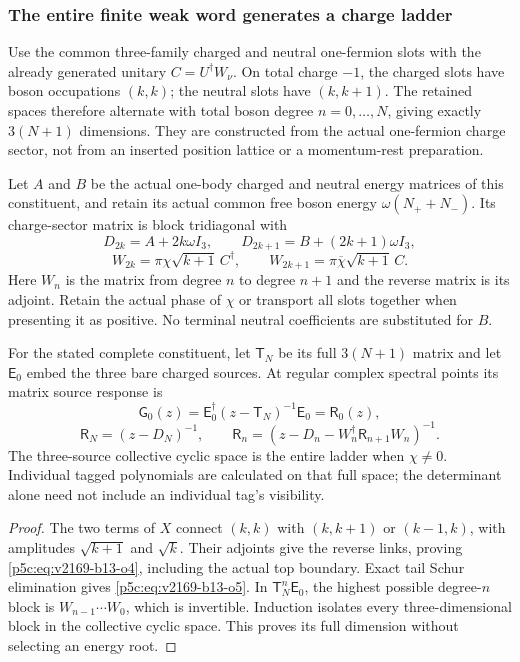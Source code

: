 \documentclass[12pt,a4paper]{article}
\begin{document}
\subsubsection{The entire finite weak word generates a charge ladder}
Use the common three-family charged and neutral one-fermion slots with
the already generated unitary $C=U^\dagger W_\nu$. On total charge $-1$,
the charged slots have boson occupations $(k,k)$; the neutral slots have
$(k,k+1)$. The retained spaces therefore alternate with total boson degree
$n=0,\ldots,N$, giving exactly $3(N+1)$ dimensions. They are constructed
from the actual one-fermion charge sector, not from an inserted position
lattice or a momentum-rest preparation.

Let $A$ and $B$ be the actual one-body charged and neutral energy matrices
of this constituent, and retain its actual common free boson energy
$\omega(N_++N_-)$. Its charge-sector matrix is block tridiagonal with
\[
 D_{2k}=A+2k\omega I_3,\qquad
 D_{2k+1}=B+(2k+1)\omega I_3,
\]
\begin{equation}
 \boxed{
 W_{2k}=\pi\chi\sqrt{k+1}\,C^\dagger,\qquad
 W_{2k+1}=\pi\overline\chi\sqrt{k+1}\,C.}
 \label{p5c:eq:v2169-b13-o4}
\end{equation}
Here $W_n$ is the matrix from degree $n$ to degree $n+1$ and the reverse
matrix is its adjoint. Retain the actual phase of $\chi$ or transport all
slots together when presenting it as positive.
No terminal neutral coefficients are substituted for $B$.

\begin{theorem}
\label{p5c:v2169:b13:thm:ladder}
For the stated complete constituent, let $\mathsf T_N$ be its full
$3(N+1)$ matrix and let $\mathsf E_0$ embed the three bare charged sources.
At regular complex spectral points its matrix source response is
\[
 \boxed{\mathsf G_0(z)=\mathsf E_0^\dagger
                   (z-\mathsf T_N)^{-1}\mathsf E_0=\mathsf R_0(z),}
\]
\begin{equation}
 \boxed{\mathsf R_N=(z-D_N)^{-1},\qquad
 \mathsf R_n=(z-D_n-W_n^\dagger\mathsf R_{n+1}W_n)^{-1}.}
 \label{p5c:eq:v2169-b13-o5}
\end{equation}
The three-source collective cyclic space is the entire ladder when
$\chi\ne0$. Individual tagged polynomials are calculated on that full space;
the determinant alone need not include an individual tag's visibility.
\end{theorem}
\begin{proof}
The two terms of $X$ connect $(k,k)$ with $(k,k+1)$ or $(k-1,k)$,
with amplitudes $\sqrt{k+1}$ and $\sqrt{k}$. Their adjoints give the reverse
links, proving \eqref{p5c:eq:v2169-b13-o4}, including the actual top boundary. Exact tail Schur
elimination gives \eqref{p5c:eq:v2169-b13-o5}. In $\mathsf T_N^n\mathsf E_0$, the highest possible
degree-$n$ block is $W_{n-1}\cdots W_0$, which is invertible.
Induction isolates every three-dimensional block in the collective cyclic
space. This proves its full dimension without selecting an energy root.
\end{proof}
\end{document}
